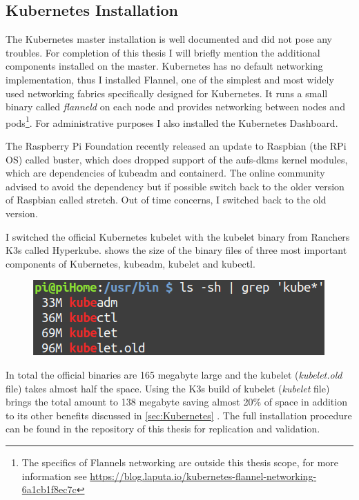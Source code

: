 \subsection{Kubernetes Installation}
The Kubernetes master installation is well documented and did not pose any troubles. For completion of this thesis I will briefly mention the additional components installed on the master. Kubernetes has no default networking implementation, thus I installed Flannel\cite{coreosFlannel:online}, one of the simplest and most widely used networking fabrics specifically designed for Kubernetes. It runs a small binary called \textit{flanneld} on each node and provides networking between nodes and pods\footnote{The specifics of Flannels networking are outside this thesis scope, for more information see \url{https://blog.laputa.io/kubernetes-flannel-networking-6a1cb1f8ec7c}}. For administrative purposes I also installed the Kubernetes Dashboard.

The Raspberry Pi Foundation recently released an update to Raspbian (the RPi OS) called buster, which does dropped support of the aufs-dkms kernel modules, which are dependencies of kubeadm and containerd. The online community advised to avoid the dependency but if possible switch back to the older version of Raspbian called stretch. Out of time concerns, I switched back to the old version. 

I switched the official Kubernetes kubelet with the kubelet binary from Ranchers K3s called Hyperkube.  shows the size of the binary files of three most important components of Kubernetes, kubeadm, kubelet and kubectl.
\begin{figure}[h!]
    \centering
    \includegraphics[scale=0.5]{figures/kubeBinariesSize.png}
    \vspace*{-0.3cm}
    \label{fig:kubeBinaries}
\end{figure}
In total the official binaries are 165 megabyte large and the kubelet (\textit{kubelet.old} file) takes almost half the space. Using the K3s build of kubelet (\textit{kubelet} file) brings the total amount to 138 megabyte saving almost 20\% of space in addition to its other benefits discussed in \cref{sec:Kubernetes} . The full installation procedure can be found in the repository of this thesis for replication and validation.

